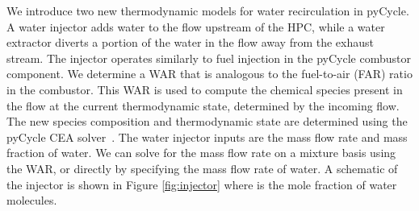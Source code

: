 \documentclass[conf]{new-aiaa}
\begin{document}
We introduce two new thermodynamic models for water recirculation in pyCycle.
A water injector adds water to the flow upstream of the HPC, while a water extractor diverts a portion of the water in the flow away from the exhaust stream.
The injector operates similarly to fuel injection in the pyCycle combustor component.
We determine a WAR that is analogous to the fuel-to-air (FAR) ratio in the combustor.
This WAR is used to compute the chemical species present in the flow at the current thermodynamic state, determined by the incoming flow.
The new species composition and thermodynamic state are determined using the pyCycle CEA solver~\cite{Gray2017b}.
The water injector inputs are the mass flow rate and mass fraction of water.
We can solve for the mass flow rate on a mixture basis using the WAR, or directly by specifying the mass flow rate of water.
A schematic of the injector is shown in Figure \ref{fig:injector} where  is the mole fraction of water molecules.
\end{document}
